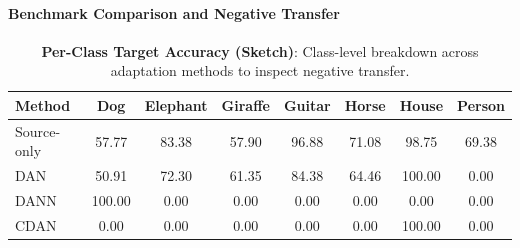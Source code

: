 \documentclass{article}
\begin{document}
\paragraph{Benchmark Comparison and Negative Transfer}
\begin{table}[H]
    \centering
    \caption{\textbf{Task 2 Benchmark Comparison on PACS (Target: Sketch)}: Source validation metrics per domain, mean source performance, target performance, accuracy gain relative to Source-only, and domain separability score (70/30 logistic regression; 50\% = chance).}
    \label{tab:task2_main_results}
\end{table}

\begin{table}[H]
    \centering
    \caption{\textbf{Per-Class Target Accuracy (Sketch)}: Class-level breakdown across adaptation methods to inspect negative transfer.}
    \label{tab:task2_per_class}
    \begin{tabular}{lccccccc}
        \toprule
        \textbf{Method} & \textbf{Dog} & \textbf{Elephant} & \textbf{Giraffe} & \textbf{Guitar} & \textbf{Horse} & \textbf{House} & \textbf{Person} \\
        \midrule
        Source-only & 57.77 & 83.38 & 57.90 & 96.88 & 71.08 & 98.75 & 69.38 \\
        DAN & 50.91 & 72.30 & 61.35 & 84.38 & 64.46 & 100.00 & 0.00 \\
        DANN & 100.00 & 0.00 & 0.00 & 0.00 & 0.00 & 0.00 & 0.00 \\
        CDAN & 0.00 & 0.00 & 0.00 & 0.00 & 0.00 & 100.00 & 0.00 \\
        \bottomrule
    \end{tabular}
\end{table}
\end{document}
